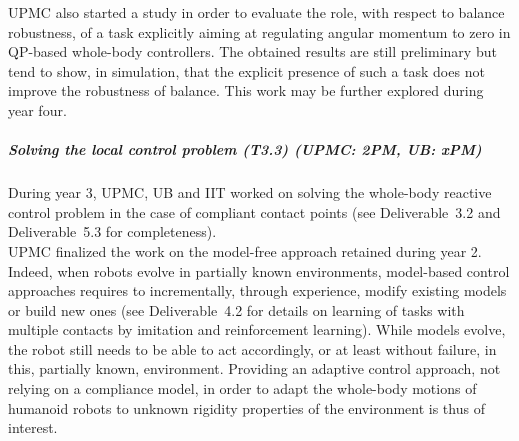 UPMC also started a study in order to evaluate the role, with respect to balance robustness, of a task explicitly aiming at regulating angular momentum to zero in QP-based whole-body controllers. The obtained results are still preliminary but  tend to show, in simulation, that the explicit presence of such a task does not improve the robustness of balance. This work may be further explored during year four.

\subparagraph*{Solving the local control problem (T3.3) (UPMC: 2PM, UB: xPM)}

During year 3, UPMC, UB and IIT worked on solving the whole-body reactive control problem in the case of compliant contact points (see Deliverable~3.2 \cite{deliverable32} and Deliverable~5.3 \cite{deliverable53} for completeness).\\

UPMC finalized the work on the model-free approach retained during year 2. Indeed, when robots evolve in partially known environments, model-based control approaches requires to incrementally, through experience, modify existing models or build new ones (see Deliverable~4.2 \cite{deliverable42} for details on learning of tasks with multiple contacts by imitation and reinforcement learning). While models evolve, the robot still needs to be able to act accordingly, or at least without failure, in this, partially known, environment. Providing an adaptive control approach, not relying on a compliance model, in order to adapt the whole-body motions of humanoid robots to unknown rigidity properties of the environment is thus of interest.

